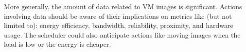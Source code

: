 More generally, the amount of data related to VM images is significant.
Actions involving data  should be aware of their implications on metrics like
(but not limited to): energy efficiency, bandwidth, reliability, proximity, and
hardware usage. The scheduler could also anticipate actions like moving images when
the load is low or the energy is cheaper.


